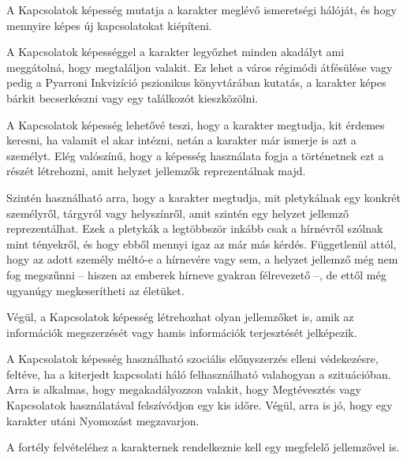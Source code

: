 
A Kapcsolatok képesség mutatja a karakter meglévő ismeretségi hálóját, és hogy mennyire képes új kapcsolatokat kiépíteni.

\overcome A Kapcsolatok képességgel a karakter legyőzhet minden akadályt ami meggátolná, hogy megtaláljon valakit. Ez lehet a város régimódi átfésülése vagy pedig a Pyarroni Inkvizíció pszionikus könyvtárában kutatás, a karakter képes bárkit becserkészni vagy egy találkozót kieszközölni.

\advantage A Kapcsolatok képesség lehetővé teszi, hogy a karakter megtudja, kit érdemes keresni, ha valamit el akar intézni, netán a karakter már ismerje is azt a személyt. Elég valószínű, hogy a képesség használata fogja a történetnek ezt a részét létrehozni, amit helyzet jellemzők reprezentálnak majd.

Szintén használható arra, hogy a karakter megtudja, mit pletykálnak egy konkrét személyről, tárgyról vagy helyszínről, amit szintén egy helyzet jellemző reprezentálhat. Ezek a pletykák a legtöbbször inkább csak a hírnévről szólnak mint tényekről, és hogy ebből mennyi igaz az már más kérdés. Függetlenül attól, hogy az adott személy méltó-e a hírnevére vagy sem, a helyzet jellemző még nem fog megszűnni -- hiszen az emberek hírneve gyakran félrevezető --, de ettől még ugyanúgy megkeserítheti az életüket.

Végül, a Kapcsolatok képesség létrehozhat olyan jellemzőket is, amik az információk megszerzését vagy hamis információk terjesztését jelképezik.

\noattackatall
 
 A Kapcsolatok képesség használható szociális előnyszerzés elleni védekezésre, feltéve, ha a kiterjedt kapcsolati háló felhasználható valahogyan a szituációban. Arra is alkalmas, hogy megakadályozzon valakit, hogy Megtévesztés vagy Kapcsolatok használatával felszívódjon egy kis időre. Végül, arra is jó, hogy egy karakter utáni Nyomozást megzavarjon.




A fortély felvételéhez a karakternek rendelkeznie kell egy megfelelő jellemzővel is.
